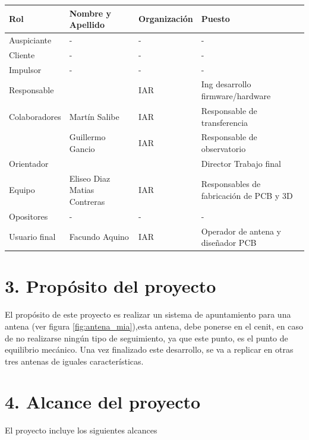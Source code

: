 \documentclass[11pt, %
codirector, %
]{charter}
\begin{document}
\begin{table}[ht]
\renewcommand {\arrayrulewidth}{1pt}
\begin{tabularx}{\linewidth}{@{}|l|X|X|l|@{}}
	\hline
	\rowcolor[HTML]{C0C0C0} 
	Rol           & Nombre y Apellido & Organización 	& Puesto 	\\ \hline
	Auspiciante   & -                 &  -             	& -        	\\ \hline
	Cliente       & -  			      &	 -				& -       	\\ \hline
	Impulsor      &  -                & -             	& -       	\\ \hline
	Responsable   & \authorname       & IAR        	    & Ing desarrollo firmware/hardware 	\\ \hline
	Colaboradores & Martín Salibe     & IAR             & Responsable de transferencia \\
				  &  Guillermo Gancio & IAR             & Responsable de observatorio \\ \hline
	Orientador    & \supname	      & \pertesupname 	& Director Trabajo final \\ \hline
	Equipo        & Eliseo Diaz \newline 
	Matias Contreras          & IAR              	& Responsables de fabricación de PCB y 3D  	\\ \hline
	Opositores    &  -                 & -             	& -        	\\ \hline
	Usuario final & Facundo Aquino     & IAR           	& Operador de antena  y diseñador PCB    	\\ \hline
\end{tabularx}
\end{table}




\section{3. Propósito del proyecto}
\label{sec:proposito}
	El propósito de este proyecto es realizar un sistema de apuntamiento para una antena (ver figura \ref{fig:antena_mia}),esta antena, debe ponerse en el cenit, en caso de no realizarse ningún tipo de seguimiento, ya que este punto, es el punto de equilibrio mecánico. Una vez finalizado este desarrollo, se va a  replicar en otras tres antenas de iguales características. 


\section{4. Alcance del proyecto}
\label{sec:alcance}
El proyecto incluye los siguientes alcances 
\end{document}
